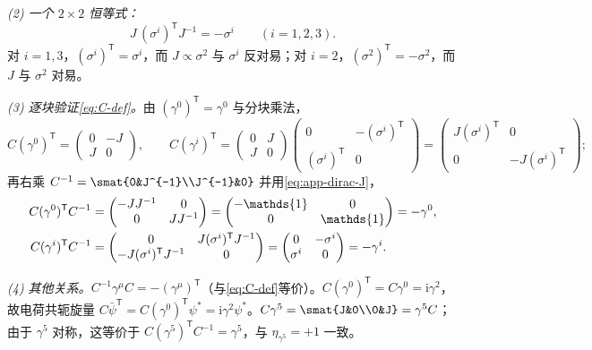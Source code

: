 \documentclass[UTF8,a4paper,11pt,fontset=fandol]{ctexart}
\let\amsmathbb\mathbb
\renewcommand{\mathbb}[1]{\ifx1#1\mathds{1}\else\amsmathbb{#1}\fi}
\theoremstyle{cplain}
\theoremstyle{cdefinition}
\theoremstyle{cremark}
\numberwithin{equation}{section}
\newcommand{\tp}{\mathsf{T}}                         %
\newcommand{\ii}{\mathrm{i}}                        %
\begin{document}
\emph{(2) 一个 $2\times2$ 恒等式：}
\begin{equation}\label{eq:app-dirac-J}
J\,(\sigma^i)^{\tp}J^{-1}=-\sigma^i\qquad(i=1,2,3).
\end{equation}
对 $i=1,3$，$(\sigma^i)^{\tp}=\sigma^i$，而 $J\propto\sigma^2$ 与 $\sigma^i$ 反对易；对 $i=2$，$(\sigma^2)^{\tp}=-\sigma^2$，而 $J$ 与 $\sigma^2$ 对易。

\emph{(3) 逐块验证\cref{eq:C-def}。}由 $(\gamma^0)^{\tp}=\gamma^0$ 与分块乘法，
\[
C(\gamma^0)^{\tp}=\begin{pmatrix}0&-J\\J&0\end{pmatrix},\qquad
C(\gamma^i)^{\tp}=\begin{pmatrix}0&J\\J&0\end{pmatrix}\begin{pmatrix}0&-(\sigma^i)^{\tp}\\(\sigma^i)^{\tp}&0\end{pmatrix}=\begin{pmatrix}J(\sigma^i)^{\tp}&0\\0&-J(\sigma^i)^{\tp}\end{pmatrix};
\]
再右乘 $C^{-1}=\smat{0&J^{-1}\\J^{-1}&0}$ 并用\cref{eq:app-dirac-J}，
\begin{align*}
C(\gamma^0)^{\tp}C^{-1}&=\begin{pmatrix}-JJ^{-1}&0\\0&JJ^{-1}\end{pmatrix}=\begin{pmatrix}-\mathbb 1&0\\0&\mathbb 1\end{pmatrix}=-\gamma^0,\\
C(\gamma^i)^{\tp}C^{-1}&=\begin{pmatrix}0&J(\sigma^i)^{\tp}J^{-1}\\-J(\sigma^i)^{\tp}J^{-1}&0\end{pmatrix}=\begin{pmatrix}0&-\sigma^i\\ \sigma^i&0\end{pmatrix}=-\gamma^i .
\end{align*}

\emph{(4) 其他关系。}$C^{-1}\gamma^\mu C=-(\gamma^\mu)^{\tp}$（与\cref{eq:C-def}等价）。$C(\gamma^0)^{\tp}=C\gamma^0=\ii\gamma^2$，故电荷共轭旋量 $C\bar\psi^{\tp}=C(\gamma^0)^{\tp}\psi^*=\ii\gamma^2\psi^*$。$C\gamma^5=\smat{J&0\\0&J}=\gamma^5C$；由于 $\gamma^5$ 对称，这等价于 $C(\gamma^5)^{\tp}C^{-1}=\gamma^5$，与 $\eta_{\gamma^5}=+1$ 一致。
\end{document}
